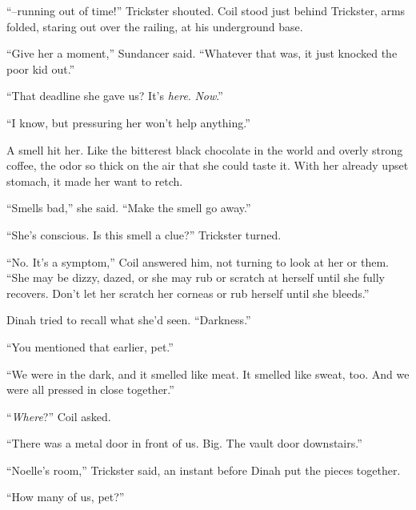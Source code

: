 ``--running out of time!'' Trickster shouted.  Coil stood just behind Trickster, arms folded, staring out over the railing, at his underground base.



``Give her a moment,'' Sundancer said.  ``Whatever that was, it just knocked the poor kid out.''



``That deadline she gave us?  It's \emph{here}.  \emph{Now}.''



``I know, but pressuring her won't help anything.''



A smell hit her.  Like the bitterest black chocolate in the world and overly strong coffee, the odor so thick on the air that she could taste it.  With her already upset stomach, it made her want to retch.



``Smells bad,'' she said.  ``Make the smell go away.''



``She's conscious.  Is this smell a clue?'' Trickster turned.



``No.  It's a symptom,'' Coil answered him, not turning to look at her or them.  ``She may be dizzy, dazed, or she may rub or scratch at herself until she fully recovers.  Don't let her scratch her corneas or rub herself until she bleeds.''



Dinah tried to recall what she'd seen.  ``Darkness.''



``You mentioned that earlier, pet.''



``We were in the dark, and it smelled like meat.  It smelled like sweat, too.  And we were all pressed in close together.''



``\emph{Where}?'' Coil asked.



``There was a metal door in front of us.  Big.  The vault door downstairs.''



``Noelle's room,'' Trickster said, an instant before Dinah put the pieces together.



``How many of us, pet?''



